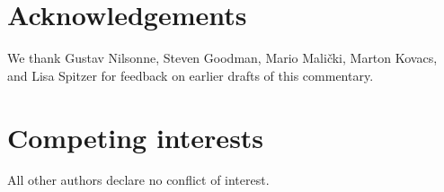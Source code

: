 \documentclass[authordate, meta]{jote-new-article}
\begin{document}
\section{Acknowledgements}



We thank Gustav Nilsonne, Steven Goodman, Mario Malički, Marton Kovacs, and Lisa Spitzer for feedback on earlier drafts of this commentary.







\section{Competing interests}



All other authors declare no conflict of interest.




\nocite{*}


\printbibliography
\end{document}
